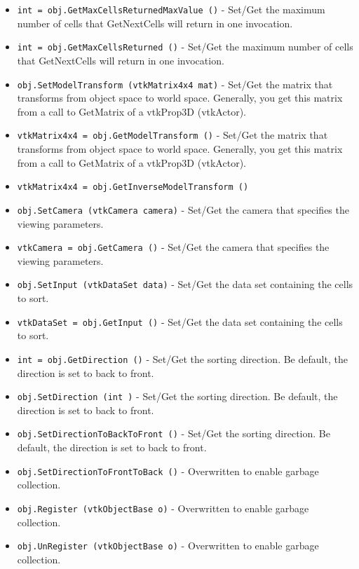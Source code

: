 \begin{itemize}
\item  \verb|int = obj.GetMaxCellsReturnedMaxValue ()| -  Set/Get the maximum number of cells that GetNextCells will return
 in one invocation.

\item  \verb|int = obj.GetMaxCellsReturned ()| -  Set/Get the maximum number of cells that GetNextCells will return
 in one invocation.

\item  \verb|obj.SetModelTransform (vtkMatrix4x4 mat)| -  Set/Get the matrix that transforms from object space to world space.
 Generally, you get this matrix from a call to GetMatrix of a vtkProp3D
 (vtkActor).

\item  \verb|vtkMatrix4x4 = obj.GetModelTransform ()| -  Set/Get the matrix that transforms from object space to world space.
 Generally, you get this matrix from a call to GetMatrix of a vtkProp3D
 (vtkActor).

\item  \verb|vtkMatrix4x4 = obj.GetInverseModelTransform ()|

\item  \verb|obj.SetCamera (vtkCamera camera)| -  Set/Get the camera that specifies the viewing parameters.

\item  \verb|vtkCamera = obj.GetCamera ()| -  Set/Get the camera that specifies the viewing parameters.

\item  \verb|obj.SetInput (vtkDataSet data)| -  Set/Get the data set containing the cells to sort.

\item  \verb|vtkDataSet = obj.GetInput ()| -  Set/Get the data set containing the cells to sort.

\item  \verb|int = obj.GetDirection ()| -  Set/Get the sorting direction.  Be default, the direction is set
 to back to front.

\item  \verb|obj.SetDirection (int )| -  Set/Get the sorting direction.  Be default, the direction is set
 to back to front.

\item  \verb|obj.SetDirectionToBackToFront ()| -  Set/Get the sorting direction.  Be default, the direction is set
 to back to front.

\item  \verb|obj.SetDirectionToFrontToBack ()| -  Overwritten to enable garbage collection.

\item  \verb|obj.Register (vtkObjectBase o)| -  Overwritten to enable garbage collection.

\item  \verb|obj.UnRegister (vtkObjectBase o)| -  Overwritten to enable garbage collection.

\end{itemize}
